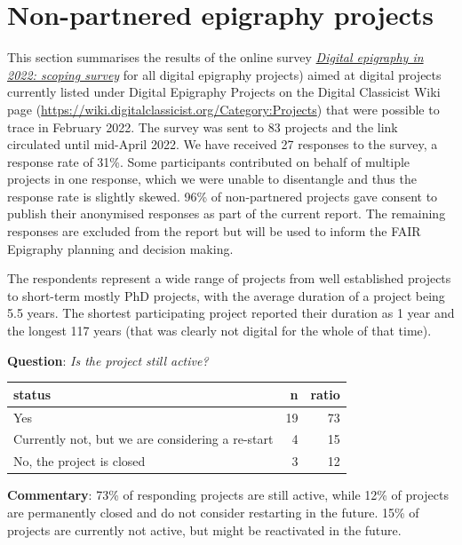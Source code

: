 \documentclass[
  10pt,
]{article}
\begin{document}
\hypertarget{non-partnered-epigraphy-projects}{%
\section{Non-partnered epigraphy
projects}\label{non-partnered-epigraphy-projects}}

This section summarises the results of the online survey
\href{https://github.com/FAIR-epigraphy/scoping_survey_report/data/02_Survey_projects_questions.pdf}{\emph{Digital
epigraphy in 2022: scoping survey}} for all digital epigraphy projects)
aimed at digital projects currently listed under Digital Epigraphy
Projects on the Digital Classicist Wiki page
(\url{https://wiki.digitalclassicist.org/Category:Projects}) that were
possible to trace in February 2022. The survey was sent to 83 projects
and the link circulated until mid-April 2022. We have received 27
responses to the survey, a response rate of 31\%. Some participants
contributed on behalf of multiple projects in one response, which we
were unable to disentangle and thus the response rate is slightly
skewed. 96\% of non-partnered projects gave consent to publish their
anonymised responses as part of the current report. The remaining
responses are excluded from the report but will be used to inform the
FAIR Epigraphy planning and decision making.

The respondents represent a wide range of projects from well established
projects to short-term mostly PhD projects, with the average duration of
a project being 5.5 years. The shortest participating project reported
their duration as 1 year and the longest 117 years (that was clearly not
digital for the whole of that time).

\textbf{Question}: \emph{Is the project still active?}

\begin{longtable}[]{@{}lrr@{}}
\toprule
status & n & ratio \\
\midrule
\endhead
Yes & 19 & 73 \\
Currently not, but we are considering a re-start & 4 & 15 \\
No, the project is closed & 3 & 12 \\
\bottomrule
\end{longtable}

\textbf{Commentary}: 73\% of responding projects are still active, while
12\% of projects are permanently closed and do not consider restarting
in the future. 15\% of projects are currently not active, but might be
reactivated in the future.
\end{document}
